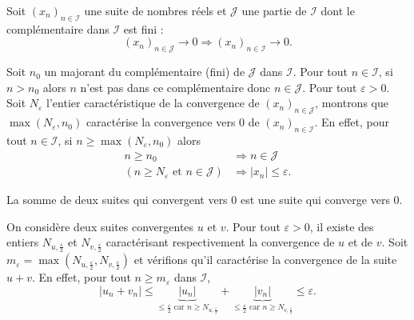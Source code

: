 \begin{propn} \label{convfini}
 Soit $(x_n)_{n\in \mathcal I}$ une suite de nombres réels et $\mathcal J$ une partie de $\mathcal I$ dont le complémentaire dans $\mathcal{I}$ est fini :
\begin{displaymath}
 (x_n)_{n\in \mathcal J} \rightarrow 0 \Rightarrow (x_n)_{n\in \mathcal I} \rightarrow 0.
\end{displaymath}
\end{propn}
\begin{demo}
Soit $n_0$ un majorant du complémentaire (fini) de $\mathcal{J}$ dans $\mathcal{I}$. Pour tout $n\in \mathcal{I}$, si $n > n_0$ alors $n$ n'est pas dans ce complémentaire donc $n\in \mathcal{J}$. Pour tout $\varepsilon >0$. Soit $N_\varepsilon$ l'entier caractéristique de la convergence de $(x_n)_{n\in \mathcal J}$, montrons que $\max(N_\varepsilon , n_0)$ caractérise la convergence vers $0$ de $(x_n)_{n\in \mathcal I}$. En effet, pour tout $n\in \mathcal{I}$, si $n\geq \max(N_\varepsilon , n_0)$ alors
\begin{align*}
  n\geq n_0 &\Rightarrow n \in \mathcal{J} \\
  \left( n\geq N_\varepsilon \text{ et } n \in \mathcal{J}\right)  &\Rightarrow |x_n| \leq \varepsilon.
\end{align*}
\end{demo}

\begin{propn} \label{convsomm}
 La somme de deux suites qui convergent vers $0$ est une suite qui converge vers $0$.
\end{propn}
\begin{demo}
  On considère deux suites convergentes $u$ et $v$. Pour tout $\varepsilon>0$, il existe des entiers $N_{u,\frac{\varepsilon}{2}}$ et $N_{v,\frac{\varepsilon}{2}}$ caractérisant respectivement la convergence de $u$ et de $v$.
  Soit $m_{\varepsilon} = \max(N_{u,\frac{\varepsilon}{2}}, N_{v,\frac{\varepsilon}{2}})$  et vérifions qu'il caractérise la convergence de la suite $u+v$.\newline
En effet, pour tout $n\geq m_\varepsilon$ dans $\mathcal{I}$,
\begin{displaymath}
|u_n + v_n| \leq  
  \underset{\leq \frac{\varepsilon}{2} \text{ car } n\geq N_{u,\frac{\varepsilon}{2}}}{\underbrace{|u_n|}}
+ \underset{\leq \frac{\varepsilon}{2} \text{ car } n\geq N_{v,\frac{\varepsilon}{2}}}{\underbrace{|v_n|}}  
\leq \varepsilon .
\end{displaymath}
\end{demo}

